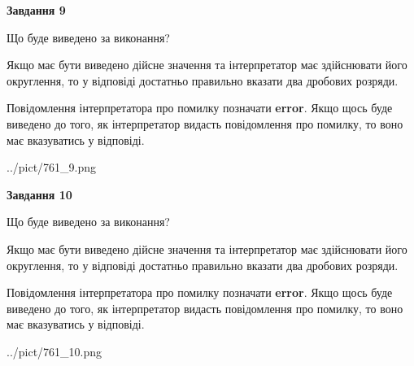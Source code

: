 \documentclass[12pt, ukrainian]{article}
\begin{document}
{\begin {Large}
{\begin {center}\textbf{Завдання 9}\end {center}}\par
Що буде виведено за виконання? \par

Якщо має бути виведено дійсне значення та інтерпретатор має здійснювати його округлення, 
то у відповіді достатньо правильно вказати два дробових розряди.

Повідомлення інтерпретатора про помилку позначати \textbf{error}.
Якщо щось буде виведено до того, як інтерпретатор видасть повідомлення про помилку, 
то воно має вказуватись у відповіді. \par

\begin{center}
	{../pict/761_9.png}
\end{center}
\newpage

{\begin {center}\textbf{Завдання 10}\end {center}}\par
Що буде виведено за виконання? \par

Якщо має бути виведено дійсне значення та інтерпретатор має здійснювати його округлення, 
то у відповіді достатньо правильно вказати два дробових розряди.

Повідомлення інтерпретатора про помилку позначати \textbf{error}.
Якщо щось буде виведено до того, як інтерпретатор видасть повідомлення про помилку, 
то воно має вказуватись у відповіді. \par

\begin{center}
	{../pict/761_10.png}
\end{center}
\newpage

\end {Large}}
\end{document}

